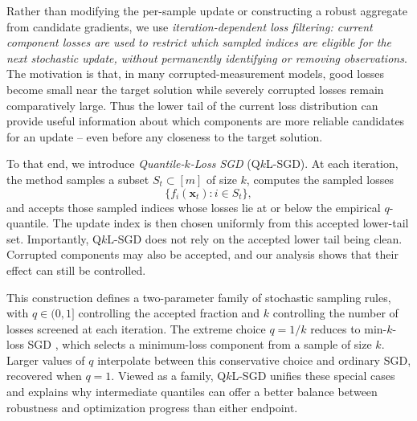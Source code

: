 \documentclass[11pt]{article}
\newcommand{\ve}[1]{\mathbf{#1}}
\begin{document}
Rather than modifying the per-sample update or constructing a robust aggregate
from candidate gradients, we use  \emph{iteration-dependent loss filtering: current component losses are used to
restrict which sampled indices are eligible for the next stochastic update,
without permanently identifying or removing observations}. The motivation is
that, in many corrupted-measurement models, good losses become small near the
target solution while severely corrupted losses remain comparatively large.
Thus the lower tail of the current loss distribution can provide useful
information about which components are more reliable candidates for an update -- even before any closeness to the target solution.


To that end, we introduce \emph{Quantile-\(k\)-Loss SGD} (Q\(k\)L-SGD). At each
iteration, the method samples a subset \(S_t\subset[m]\) of size \(k\), computes
the sampled losses
\[
\{f_i(\ve{x}_t):i\in S_t\},
\]
and accepts those sampled indices whose losses lie at or below the empirical
\(q\)-quantile. The update index is then chosen uniformly from this accepted
lower-tail set. Importantly, Q\(k\)L-SGD does not rely on the accepted lower tail being clean.
Corrupted components may also be accepted, and our analysis
shows that their effect can still be controlled.


This construction defines a two-parameter family of stochastic sampling rules,
with \(q\in(0,1]\) controlling the accepted fraction and \(k\) controlling the
number of losses screened at each iteration. The extreme choice \(q=1/k\)
reduces to min-\(k\)-loss SGD \citep{shah2020choosing}, which selects a minimum-loss component from a
sample of size \(k\). Larger values of \(q\) interpolate between this
conservative choice and ordinary SGD, recovered when \(q=1\). Viewed as a
family, Q\(k\)L-SGD unifies these special cases and explains why intermediate quantiles can offer a better balance between
robustness and optimization progress than either endpoint.
\end{document}
